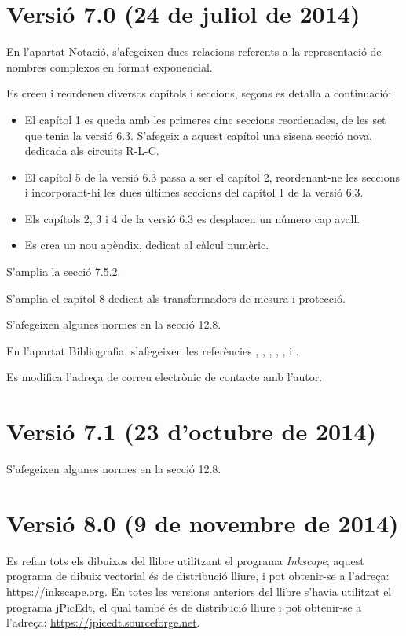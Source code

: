 \section*{Versió 7.0 (24 de juliol de 2014)}

En l'apartat Notació, s'afegeixen dues  relacions referents a la representació de nombres complexos en format exponencial.

Es creen i reordenen diversos capítols i seccions, segons es detalla a continuació:
\begin{itemize}
   \item El capítol 1 es queda amb les primeres cinc seccions reordenades, de les set que tenia la versió 6.3. S'afegeix a aquest capítol una sisena secció nova, dedicada als circuits R-L-C.
   \item El capítol 5 de la versió 6.3 passa a ser el capítol 2, reordenant-ne les  seccions i incorporant-hi les dues últimes seccions del capítol 1 de la versió 6.3.
   \item Els capítols 2, 3 i 4  de la versió 6.3 es desplacen un número cap avall.
   \item Es crea un nou apèndix, dedicat al càlcul numèric.
\end{itemize}

S'amplia la secció 7.5.2.

S'amplia el capítol 8 dedicat als transformadors de mesura i protecció.

S'afegeixen algunes normes en la secció 12.8.

En l'apartat Bibliografia, s'afegeixen les referències \cite{GOM}, \cite{SPK}, \cite{JDH}, \cite{EJB},  \cite{PMA}, \cite{MAI} i \cite{KNU}.

Es modifica l'adreça de correu electrònic de contacte amb l'autor.


\section*{Versió 7.1 (23 d'octubre de 2014)}

S'afegeixen algunes normes en la secció 12.8.


\section*{Versió 8.0 (9 de novembre de 2014)}

Es refan tots els dibuixos del llibre utilitzant el programa \emph{Inkscape}; aquest programa de dibuix vectorial és de distribució lliure, i pot obtenir-se a l'adreça: \href{https://inkscape.org/}{https://inkscape.org}. En totes les versions anteriors del llibre s'havia utilitzat el programa jPicEdt, el qual també és de distribució lliure i pot obtenir-se a l'adreça: \href{https://jpicedt.sourceforge.net//}{https://jpicedt.sourceforge.net}.

